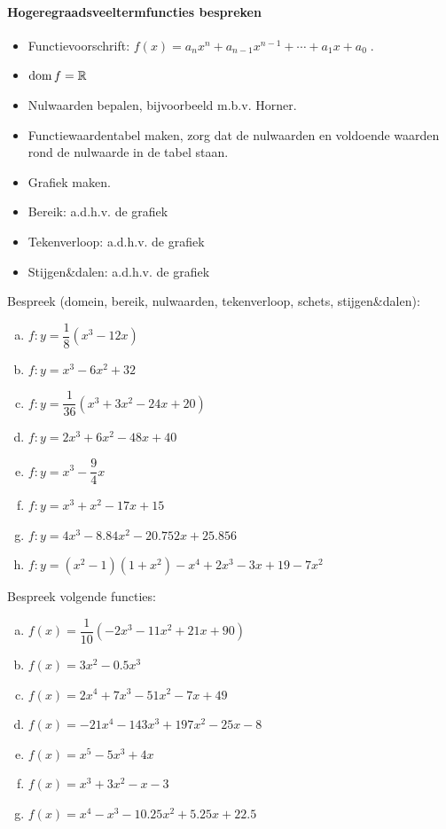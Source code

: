 \documentclass[12pt]{article}
\begin{document}
\paragraph*{Hogeregraadsveeltermfuncties bespreken}
\begin{mdframed}
  \begin{itemize}
  \item Functievoorschrift: $f(x)= a_nx^n + a_{n-1}x^{n-1} + \cdots + a_1x + a_0\;.$
  \item $\dom f = \mathbb{R}$
  \item Nulwaarden bepalen, bijvoorbeeld m.b.v. Horner.
  \item Functiewaardentabel maken, zorg dat de nulwaarden en voldoende waarden rond de nulwaarde in de tabel staan.
  \item Grafiek maken.
  \item Bereik: a.d.h.v. de grafiek
  \item Tekenverloop: a.d.h.v. de grafiek
  \item Stijgen\&dalen: a.d.h.v. de grafiek
  \end{itemize}
\end{mdframed}



\begin{oefening}
Bespreek (domein, bereik, nulwaarden, tekenverloop, schets, stijgen\&dalen):\\
\begin{enumerate}[(a)]
  \itemsep1em
  \item $f:y=\dfrac{1}{8}(x^3-12x)$
  \item $f:y=x^3-6x^2+32$
  \item $f:y=\dfrac{1}{36}(x^3+3x^2-24x+20)$
  \item $f:y=2x^3+6x^2-48x+40$
  \item $f:y=x^3-\dfrac{9}{4}x$
  \item $f:y=x^3+x^2-17x+15$
  \item $f:y=4x^3-8.84x^2-20.752x+25.856$
  \item $f:y=(x^2-1)(1+x^2)-x^4+2x^3-3x+19-7x^2$
\end{enumerate}
\end{oefening}

\begin{oefening}
  Bespreek volgende functies:
  \begin{enumerate}[(a)]
  \itemsep.5em
  \item $f(x)=\dfrac{1}{10}(-2x^3-11x^2+21x+90)$
  \item $f(x)=3x^2-0.5x^3$
  \item $f(x)=2x^4+7x^3-51x^2-7x+49$
  \item $f(x)=-21x^4-143x^3+197x^2-25x-8$
  \item $f(x)=x^5-5x^3+4x$
  \item $f(x)=x^3+3x^2-x-3$
  \item $f(x)=x^4-x^3-10.25x^2+5.25x+22.5$
  \end{enumerate}
\end{oefening}
\end{document}

